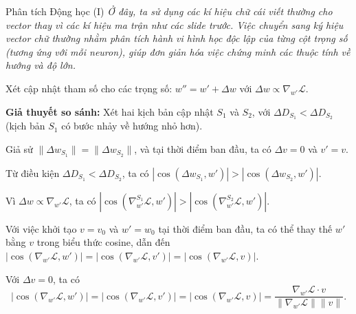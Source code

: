 \documentclass[11pt,aspectratio=169]{beamer}
\begin{document}
\begin{frame}[t]{Phân tích Động học (I)}
    \scriptsize
    \textit{Ở đây, ta sử dụng các kí hiệu chữ cái viết thường cho vector thay vì các kí hiệu ma trận như các slide trước. Việc chuyển sang ký hiệu vector chữ thường nhằm phân tích hành vi hình học độc lập của từng cột trọng số (tương ứng với mỗi neuron), giúp đơn giản hóa việc chứng minh các thuộc tính về hướng và độ lớn.}

    Xét cập nhật tham số cho các trọng số: $w'' = w' + \Delta w$ với $\Delta w \propto \nabla_{w'} \mathcal{L}$.

    \textbf{Giả thuyết so sánh:} Xét hai kịch bản cập nhật $S_1$ và $S_2$, với $\Delta D_{S_1} < \Delta D_{S_2}$ (kịch bản $S_1$ có bước nhảy về hướng nhỏ hơn).
    
    Giả sử $\|\Delta w_{S_1}\| =  \|\Delta w_{S_2}\|$, và tại thời điểm ban đầu, ta có $\Delta v = 0$ và $v' = v$.
    
    Từ điều kiện $\Delta D_{S_1} < \Delta D_{S_2}$, ta có $|\cos(\Delta w_{S_1}, w')| > |\cos(\Delta w_{S_2}, w')|$.

    Vì $\Delta w \propto \nabla_{w'} \mathcal{L}$, ta có $\left|\cos\left(\nabla_{w'}^{S_1} \mathcal{L}, w'\right)\right| > \left|\cos\left(\nabla_{w'}^{S_2} \mathcal{L}, w'\right)\right|$.

    Với việc khởi tạo $v = v_0$ và $w'=w_0$ tại thời điểm ban đầu, ta có thể thay thế $w'$ bằng $v$ trong biểu thức cosine, dẫn đến $|\cos(\nabla_{w'}\mathcal{L}, w')| = |\cos(\nabla_{w'}\mathcal{L}, v')| = |\cos(\nabla_{w'}\mathcal{L}, v)|$.

    Với $\Delta v = 0$, ta có $$|\cos(\nabla_{w'}\mathcal{L}, w')| = |\cos(\nabla_{w'}\mathcal{L}, v')| = |\cos(\nabla_{w'}\mathcal{L}, v)| = \frac{\nabla_{w'}\mathcal{L}\cdot v}{\|\nabla_{w'}\mathcal{L}\| \|v\|}.$$


\end{frame}
\end{document}
